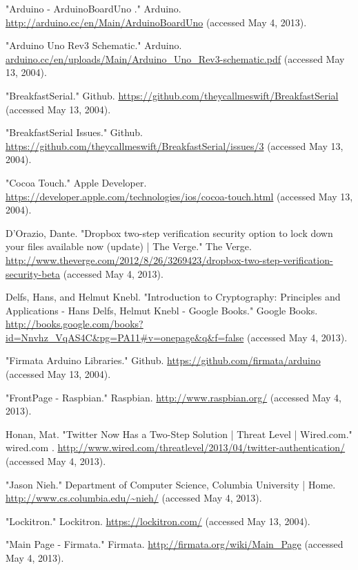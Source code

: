 \documentclass[10pt]{article}
\begin{document}
\begin{multicols}{2}
\begin{thebibliography}{99}
"Arduino - ArduinoBoardUno ." Arduino. \url{http://arduino.cc/en/Main/ArduinoBoardUno} (accessed May 4, 2013).

"Arduino Uno Rev3 Schematic." Arduino. \url{arduino.cc/en/uploads/Main/Arduino_Uno_Rev3-schematic.pdf} (accessed May 13, 2004).

"BreakfastSerial." Github. \url{https://github.com/theycallmeswift/BreakfastSerial} (accessed May 13, 2004).

"BreakfastSerial Issues." Github. \url{https://github.com/theycallmeswift/BreakfastSerial/issues/3} (accessed May 13, 2004).

"Cocoa Touch." Apple Developer. \url{https://developer.apple.com/technologies/ios/cocoa-touch.html} (accessed May 13, 2004).

D'Orazio, Dante. "Dropbox two-step verification security option to lock down your files available now (update) | The Verge." The Verge. \url{http://www.theverge.com/2012/8/26/3269423/dropbox-two-step-verification-security-beta} (accessed May 4, 2013).

Delfs, Hans, and Helmut Knebl. "Introduction to Cryptography: Principles and Applications - Hans Delfs, Helmut Knebl - Google Books." Google Books. \url{http://books.google.com/books?id=Nnvhz_VqAS4C&pg=PA11#v=onepage&q&f=false} (accessed May 4, 2013).

"Firmata Arduino Libraries." Github. \url{https://github.com/firmata/arduino} (accessed May 13, 2004).

"FrontPage - Raspbian." Raspbian. \url{http://www.raspbian.org/} (accessed May 4, 2013).

Honan, Mat. "Twitter Now Has a Two-Step Solution | Threat Level | Wired.com." wired.com . \url{http://www.wired.com/threatlevel/2013/04/twitter-authentication/} (accessed May 4, 2013).

"Jason Nieh." Department of Computer Science, Columbia University | Home. \url{http://www.cs.columbia.edu/~nieh/} (accessed May 4, 2013).

"Lockitron." Lockitron. \url{https://lockitron.com/} (accessed May 13, 2004).

"Main Page - Firmata." Firmata. \url{http://firmata.org/wiki/Main_Page} (accessed May 4, 2013).


\end{thebibliography}
\end{multicols}
\end{document}

